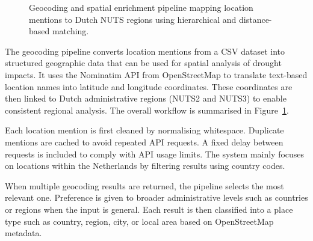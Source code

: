 \begin{figure}[h!]
    \centering
    \caption{Geocoding and spatial enrichment pipeline mapping location mentions to Dutch NUTS regions using hierarchical and distance-based matching.}
    \label{fig:geocoding_pipeline}
\end{figure}
The geocoding pipeline converts location mentions from a CSV dataset into structured geographic data that can be used for spatial analysis of drought impacts. It uses the Nominatim API from OpenStreetMap to translate text-based location names into latitude and longitude coordinates. These coordinates are then linked to Dutch administrative regions (NUTS2 and NUTS3) to enable consistent regional analysis. The overall workflow is summarised in Figure~\ref{fig:geocoding_pipeline}.

Each location mention is first cleaned by normalising whitespace. Duplicate mentions are cached to avoid repeated API requests. A fixed delay between requests is included to comply with API usage limits. The system mainly focuses on locations within the Netherlands by filtering results using country codes.

When multiple geocoding results are returned, the pipeline selects the most relevant one. Preference is given to broader administrative levels such as countries or regions when the input is general. Each result is then classified into a place type such as country, region, city, or local area based on OpenStreetMap metadata.

